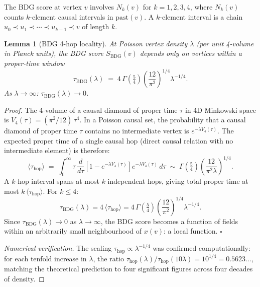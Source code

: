 \documentclass[11pt,a4paper]{article}
\newtheorem{lemma}[theorem]{Lemma}
\newcommand{\SBDG}{S_{\mathrm{BDG}}}
\begin{document}
The BDG score at vertex $v$ involves $N_k(v)$ for $k = 1,2,3,4$,
where $N_k(v)$ counts $k$-element causal intervals in
$\mathrm{past}(v)$. A $k$-element interval is a chain
$u_0 \prec u_1 \prec \cdots \prec u_{k-1} \prec v$ of length $k$.

\begin{lemma}[BDG 4-hop locality]
\label{lem:locality}
At Poisson vertex density $\lambda$ (per unit 4-volume in Planck
units), the BDG score $\SBDG(v)$ depends only on vertices within a
proper-time window
\begin{equation}
  \tau_{\mathrm{BDG}}(\lambda)
  \;=\; 4\,\Gamma\!\left(\tfrac{5}{4}\right)
        \left(\frac{12}{\pi^2}\right)^{\!1/4}
        \lambda^{-1/4}.
  \label{eq:tau_BDG}
\end{equation}
As $\lambda \to \infty$: $\tau_{\mathrm{BDG}}(\lambda) \to 0$.
\end{lemma}

\begin{proof}
The 4-volume of a causal diamond of proper time $\tau$ in 4D
Minkowski space is $V_4(\tau) = (\pi^2/12)\,\tau^4$. In a Poisson
causal set, the probability that a causal diamond of proper time $\tau$
contains no intermediate vertex is $e^{-\lambda V_4(\tau)}$. The
expected proper time of a single causal hop (direct causal relation
with no intermediate element) is therefore:
\begin{equation}
  \langle\tau_{\mathrm{hop}}\rangle
  \;=\; \int_0^\infty \tau\,
        \frac{d}{d\tau}\!\left[1 - e^{-\lambda V_4(\tau)}\right]
        e^{-\lambda V_4(\tau)}\, d\tau
  \;\sim\; \Gamma\!\left(\tfrac{5}{4}\right)
           \left(\frac{12}{\pi^2\lambda}\right)^{\!1/4}.
\end{equation}
A $k$-hop interval spans at most $k$ independent hops, giving total
proper time at most $k\,\langle\tau_{\mathrm{hop}}\rangle$. For
$k \leq 4$:
\begin{equation}
  \tau_{\mathrm{BDG}}(\lambda)
  = 4\,\langle\tau_{\mathrm{hop}}\rangle
  = 4\,\Gamma\!\left(\tfrac{5}{4}\right)
    \left(\frac{12}{\pi^2}\right)^{\!1/4}
    \lambda^{-1/4}.
\end{equation}
Since $\tau_{\mathrm{BDG}}(\lambda) \to 0$ as $\lambda \to \infty$,
the BDG score becomes a function of fields within an arbitrarily small
neighbourhood of $x(v)$: a local function. \hfill$\square$

\medskip\noindent
\emph{Numerical verification.} The scaling $\tau_{\mathrm{hop}} \propto
\lambda^{-1/4}$ was confirmed computationally: for each tenfold
increase in $\lambda$, the ratio $\tau_{\mathrm{hop}}(\lambda) /
\tau_{\mathrm{hop}}(10\lambda) = 10^{1/4} = 0.5623\ldots$, matching
the theoretical prediction to four significant figures across four
decades of density.
\end{proof}
\end{document}
